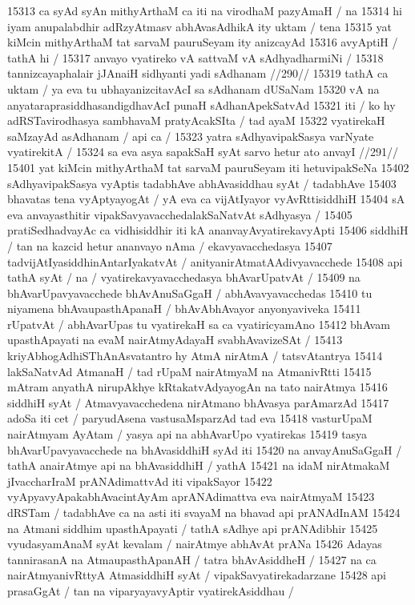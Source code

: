 15313 ca syAd syAn mithyArthaM ca iti na virodhaM pazyAmaH / na  
15314 hi iyam anupalabdhir adRzyAtmasv abhAvasAdhikA ity uktam / tena 
15315 yat kiMcin mithyArthaM tat sarvaM pauruSeyam ity anizcayAd
15316 avyAptiH / tathA hi /
15317 	anvayo vyatireko vA sattvaM vA sAdhyadharmiNi /
15318 	tannizcayaphalair jJAnaiH sidhyanti yadi sAdhanam //290//  
15319 tathA ca uktam / ya eva tu ubhayanizcitavAcI sa sAdhanam dUSaNam
15320 vA na anyataraprasiddhasandigdhavAcI punaH sAdhanApekSatvAd  
15321 iti / ko hy adRSTavirodhasya sambhavaM pratyAcakSIta / tad ayaM  
15322 vyatirekaH saMzayAd asAdhanam / api ca /  
15323 	yatra sAdhyavipakSasya varNyate vyatirekitA /
15324 	sa eva asya sapakSaH syAt sarvo hetur ato anvayI //291//  
15401 yat kiMcin mithyArthaM tat sarvaM pauruSeyam iti hetuvipakSeNa  
15402 sAdhyavipakSasya vyAptis tadabhAve abhAvasiddhau syAt / tadabhAve
15403 bhavatas tena vyAptyayogAt / yA eva ca vijAtIyayor vyAvRttisiddhiH
15404 sA eva anvayasthitir vipakSavyavacchedalakSaNatvAt sAdhyasya /
15405 pratiSedhadvayAc ca vidhisiddhir iti kA ananvayAvyatirekavyApti  
15406 siddhiH / tan na kazcid hetur ananvayo nAma / ekavyavacchedasya
15407 tadvijAtIyasiddhinAntarIyakatvAt / anityanirAtmatAAdivyavacchede
15408 api tathA syAt / na / vyatirekavyavacchedasya bhAvarUpatvAt /
15409 na bhAvarUpavyavacchede bhAvAnuSaGgaH / abhAvavyavacchedas 
15410 tu niyamena bhAvaupasthApanaH / bhAvAbhAvayor anyonyaviveka
15411 rUpatvAt / abhAvarUpas tu vyatirekaH sa ca vyatiricyamAno  
15412 bhAvam upasthApayati na evaM nairAtmyAdayaH svabhAvavizeSAt / 
15413 kriyAbhogAdhiSThAnAsvatantro hy AtmA nirAtmA /  tatsvAtantrya
15414 lakSaNatvAd AtmanaH / tad rUpaM nairAtmyaM na AtmanivRtti 
15415 mAtram anyathA nirupAkhye kRtakatvAdyayogAn na tato nairAtmya
15416 siddhiH syAt / Atmavyavacchedena nirAtmano bhAvasya parAmarzAd  
15417 adoSa iti cet / paryudAsena vastusaMsparzAd tad eva  
15418 vasturUpaM nairAtmyam AyAtam / yasya api na abhAvarUpo vyatirekas 
15419 tasya bhAvarUpavyavacchede na bhAvasiddhiH syAd iti 
15420 na anvayAnuSaGgaH / tathA anairAtmye api na bhAvasiddhiH / yathA
15421 na idaM nirAtmakaM jIvaccharIraM prANAdimattvAd iti vipakSayor 
15422 vyApyavyApakabhAvacintAyAm aprANAdimattva eva nairAtmyaM 
15423 dRSTam / tadabhAve ca na asti iti svayaM na bhavad api prANAdInAM 
15424 na Atmani siddhim upasthApayati / tathA sAdhye api prANAdibhir 
15425 vyudasyamAnaM syAt kevalam / nairAtmye abhAvAt prANa
15426 Adayas tannirasanA na AtmaupasthApanAH / tatra bhAvAsiddheH /
15427 na ca nairAtmyanivRttyA AtmasiddhiH syAt / vipakSavyatirekadarzane
15428 api prasaGgAt / tan na viparyayavyAptir vyatirekAsiddhau /  
